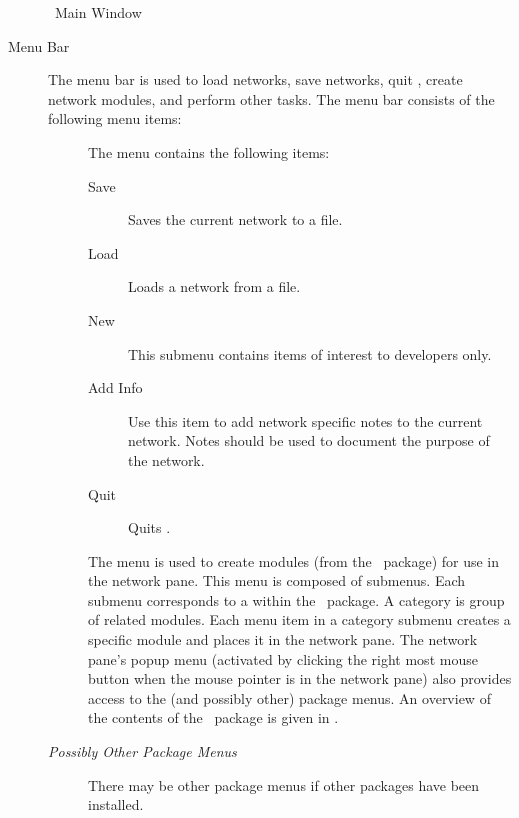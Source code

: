 \begin{figure}[htb]
  \begin{makeimage}
  \end{makeimage}
  \srwindow
  \caption{\label{fig:srwindow} \sr\ Main Window}
\end{figure}

\begin{description}
\item[Menu Bar] The menu bar is used to load networks, save networks, quit
  \sr, create network modules, and perform other tasks.  The menu bar
  consists of the following menu items:

  \begin{description}
  \item[] The  menu contains the following items:
    \begin{description}
    \item[Save] Saves the current network to a file.
    \item[Load] Loads a network from a file.
    \item[New] This submenu contains items of interest to developers only.
    \item[Add Info] Use this item to add network specific notes to
      the current network.  Notes should be used to document the purpose of
      the network.
    \item[Quit] Quits \sr.
    \end{description}
  \end{description}
  
  \begin{description}
  \item[] The  menu is used to create modules
    (from the \sr\ package) for use in the network pane.  This menu is
    composed of submenus. Each submenu corresponds to a 
     within the \sr\ package.  A category is group of
    related modules.  Each menu item in a category submenu creates a
    specific module and places it in the network pane.  The network pane's
    popup menu (activated by clicking the right most mouse button when the
    mouse pointer is in the network pane) also provides access to the
     (and possibly other) package menus.  An overview of the
    contents of the \sr\ package is given in .
  \end{description}

  \begin{description}
  \item [\textit{Possibly Other Package Menus}] There may be other package
    menus if other packages have been installed.
  \end{description}


\end{description}
